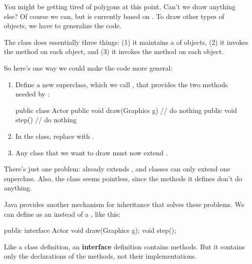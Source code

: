You might be getting tired of polygons at this point.
Can't we draw anything else?
Of course we can, but  is currently based on .
To draw other types of objects, we have to generalize the code.

The  class does essentially three things: (1) it maintains a  of objects, (2) it invokes the  method on each object, and (3) it invokes the  method on each object.

So here's one way we could make the code more general:

\begin{enumerate}

\item Define a new superclass, which we call , that provides the two methods needed by :

\begin{code}
public class Actor {
    public void draw(Graphics g) {
        // do nothing
    }
    public void step() {
        // do nothing
    }
}
\end{code}

\item In the  class, replace  with .

\item Any class that we want to draw must now extend .

\end{enumerate}

There's just one problem:  already extends , and classes can only extend one superclass.
Also, the  class seems pointless, since the methods it defines don't do anything.


Java provides another mechanism for inheritance that solves these problems.
We can define  as an  instead of a , like this:

\begin{code}
public interface Actor {
    void draw(Graphics g);
    void step();
}
\end{code}


Like a class definition, an {\bf interface} definition contains methods.
But it contains only the declarations of the methods, not their implementations.

